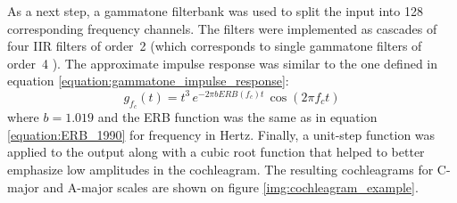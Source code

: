 As a next step, a gammatone filterbank was used to split the input into 128 corresponding frequency channels. The filters were implemented as cascades of four IIR filters of order~2 (which corresponds to single gammatone filters of order~4 \cite{brian2hears}). The approximate impulse response was similar to the one defined in equation \ref{equation:gammatone_impulse_response}:
\begin{equation}
	g_{f_c}(t) = t^3\,e^{-2\pi{}bERB(f_c)t}\,\cos(2\pi{}f_c{}t)
\end{equation}
where $b=1.019$ and the ERB function was the same as in equation \ref{equation:ERB_1990} for frequency in Hertz. Finally, a unit-step function was applied to the output along with a cubic root function that helped to better emphasize low amplitudes in the cochleagram. The resulting cochleagrams for C-major and A-major scales are shown on figure \ref{img:cochleagram_example}.\\

